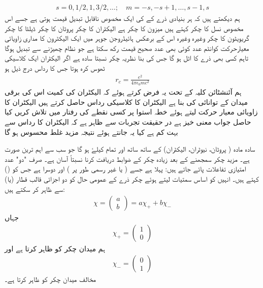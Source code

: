 \begin{align} 
s = 0, 1/2, 1, 3/2, \dotsc ; \quad m = - s, - s + 1 , \dotsc , s - 1, s
\end{align}
ہم دیکھتے ہیں کہ ہر بنیادی ذرے کے  کی ایک مخصوص ناقابل تبدیل قیمت ہوتی ہے جسے اس مخصوص نسل کا چکر کہتے ہیں  میزون کا چکر  ہے الیکٹران کا چکر  پروٹان کا چکر  ڈیلٹا کا چکر  گریویٹون کا چکر  وغیرہ وغیرہ اس کے برعکس ہائیڈروجن جوہر میں ایک الیکٹرون کا مداری زاویائی معیارحرکت کوانٹم عدد  کوئی بھی عدد صحیح قیمت رکھ سکتا ہے جو نظام چھیڑنے سے تبدیل ہوگا تاہم کسی بھی ذرے کا  اٹل ہو گا جس کی بنا نظریہ چکر نسبتا سادہ ہے 
اگر الیکٹران ایک کلاسیکی ٹھوس کرہ ہوتا جس کا رداس درج ذیل ہو 
\begin{align}
r_c = \frac{e^2}{4 \pi \epsilon_0 m c ^2}
\end{align}
ہم آئنشٹائن کلیہ  کے تحت یہ فرض کرتے ہوئے کہ الیکٹران کی کمیت اس کی برقی میدان کے توانائی کی بنا ہے الیکٹران کا کلاسیکی رداس حاصل کرتے ہیں الیکٹران کا زاویائی معیار حرکت  لیتے ہوئے خطہ استوا پر کسی نقطے کی رفتار  میں تلاش کریں کیا حاصل جواب معنی خیز ہے در حقیقت تجربات سے ظاہر ہے کہ الیکٹران کا رداس  سے بہت کم ہے کیا یہ جانتے ہوئے نتیجہ مزید غلط محسوس ہو گا 


سادہ مادہ ( پروٹان،  نیوٹران،  الیکٹران)  کے ساتھ ساتھ   اور تمام   کیلۓ    ہو گا جو سب سے اہم ترین صورت ہے۔ مزید چکر سمجھنے کے بعد زیادہ چکر کے ضوابط  دریافت کرنا نسبتاً   آسان ہے۔  صرف "دو"   عدد امتیازی تفاعلات  پائے جاتے ہیں:  پہلا   ہے جسے   ( یا غیر رسمی طور پر  ) اور دوسرا  ہے جس کو   () کہتے ہیں۔ انہیں کو  اساس سمتیات لیتے   ہوئے     چکر ذرے  کے عمومی حال کو دو اجزائی قالب قطار   (یا) سے ظاہر کر سکتے ہیں:
\begin{align}\label{مساوات_تین_بعدی_عمومی_حال_چائے}
 \chi=\begin{pmatrix} a \\ b \end{pmatrix}= a\chi_{+} + b\chi_{-} 
 \end{align}
جہاں
\begin{align} 
 \chi_{+}=\begin{pmatrix}1\\0 \end{pmatrix}
 \end{align}
ہم میدان چکر  کو ظاہر کرتا ہے اور  
\begin{align} 
 \chi_{-}=\begin{pmatrix}0 \\1 \end{pmatrix}
 \end{align}
مخالف میدان چکر کو ظاہر کرتا ہے۔

